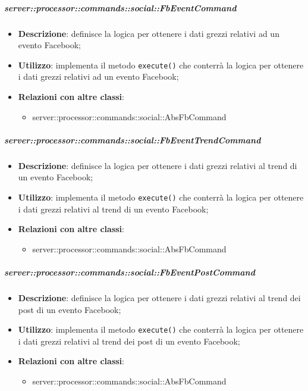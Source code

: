         \subparagraph{server::processor::commands::social::FbEventCommand} %
        \label{subp:bdsm_app_server_processor_commands_social_fbeventcommand}
        \begin{itemize}
          \item \textbf{Descrizione}: definisce la logica per ottenere i dati grezzi relativi ad un evento Facebook;
          \item \textbf{Utilizzo}: implementa il metodo \texttt{execute()} che conterrà la logica per ottenere i dati grezzi relativi ad un evento Facebook;
          \item \textbf{Relazioni con altre classi}:
            \begin{itemize}
              \item server::processor::commands::social::AbsFbCommand
            \end{itemize}
        \end{itemize}

        \subparagraph{server::processor::commands::social::FbEventTrendCommand} %
        \label{subp:bdsm_app_server_processor_commands_social_fbeventtrendcommand}
        \begin{itemize}
          \item \textbf{Descrizione}: definisce la logica per ottenere i dati grezzi relativi al trend di un evento Facebook;
          \item \textbf{Utilizzo}: implementa il metodo \texttt{execute()} che conterrà la logica per ottenere i dati grezzi relativi al trend di un evento Facebook;
          \item \textbf{Relazioni con altre classi}:
            \begin{itemize}
              \item server::processor::commands::social::AbsFbCommand
            \end{itemize}
        \end{itemize}

        \subparagraph{server::processor::commands::social::FbEventPostCommand} %
        \label{subp:bdsm_app_server_processor_commands_social_fbeventpostcommand}
        \begin{itemize}
          \item \textbf{Descrizione}: definisce la logica per ottenere i dati grezzi relativi al trend dei post di un evento Facebook;
          \item \textbf{Utilizzo}: implementa il metodo \texttt{execute()} che conterrà la logica per ottenere i dati grezzi relativi al trend dei post di un evento Facebook;
          \item \textbf{Relazioni con altre classi}:
            \begin{itemize}
              \item server::processor::commands::social::AbsFbCommand
            \end{itemize}
        \end{itemize}

